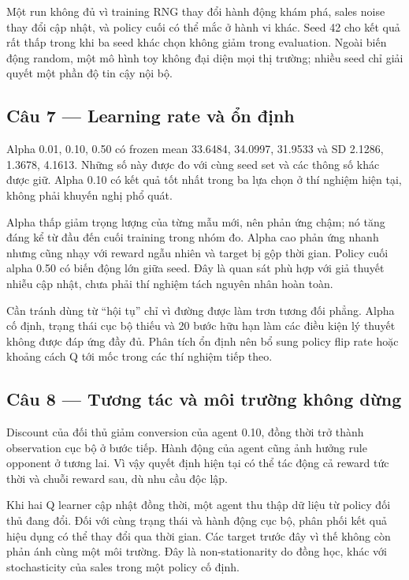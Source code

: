 Một run không đủ vì training RNG thay đổi hành động khám phá, sales
noise thay đổi cập nhật, và policy cuối có thể mắc ở hành vi khác. Seed
42 cho kết quả rất thấp trong khi ba seed khác chọn không giảm trong
evaluation. Ngoài biến động random, một mô hình toy không đại diện mọi
thị trường; nhiều seed chỉ giải quyết một phần độ tin cậy nội bộ.

\subsection{Câu 7 --- Learning rate và ổn
định}\label{cuxe2u-7-learning-rate-vuxe0-ux1ed5n-ux111ux1ecbnh}

Alpha 0.01, 0.10, 0.50 có frozen mean 33.6484, 34.0997, 31.9533 và SD
2.1286, 1.3678, 4.1613. Những số này được đo với cùng seed set và các
thông số khác được giữ. Alpha 0.10 có kết quả tốt nhất trong ba lựa chọn
ở thí nghiệm hiện tại, không phải khuyến nghị phổ quát.

Alpha thấp giảm trọng lượng của từng mẫu mới, nên phản ứng chậm; nó tăng
đáng kể từ đầu đến cuối training trong nhóm đo. Alpha cao phản ứng nhanh
nhưng cũng nhạy với reward ngẫu nhiên và target bị gộp thời gian. Policy
cuối alpha 0.50 có biến động lớn giữa seed. Đây là quan sát phù hợp với
giả thuyết nhiễu cập nhật, chưa phải thí nghiệm tách nguyên nhân hoàn
toàn.

Cần tránh dùng từ ``hội tụ'' chỉ vì đường được làm trơn tương đối phẳng.
Alpha cố định, trạng thái cục bộ thiếu và 20 bước hữu hạn làm các điều
kiện lý thuyết không được đáp ứng đầy đủ. Phân tích ổn định nên bổ sung
policy flip rate hoặc khoảng cách Q tới mốc trong các thí nghiệm tiếp
theo.

\subsection{Câu 8 --- Tương tác và môi trường không
dừng}\label{cuxe2u-8-tux1b0ux1a1ng-tuxe1c-vuxe0-muxf4i-trux1b0ux1eddng-khuxf4ng-dux1eebng}

Discount của đối thủ giảm conversion của agent 0.10, đồng thời trở thành
observation cục bộ ở bước tiếp. Hành động của agent cũng ảnh hưởng rule
opponent ở tương lai. Vì vậy quyết định hiện tại có thể tác động cả
reward tức thời và chuỗi reward sau, dù nhu cầu độc lập.

Khi hai Q learner cập nhật đồng thời, một agent thu thập dữ liệu từ
policy đối thủ đang đổi. Đối với cùng trạng thái và hành động cục bộ,
phân phối kết quả hiệu dụng có thể thay đổi qua thời gian. Các target
trước đây vì thế không còn phản ánh cùng một môi trường. Đây là
non-stationarity do đồng học, khác với stochasticity của sales trong một
policy cố định.

